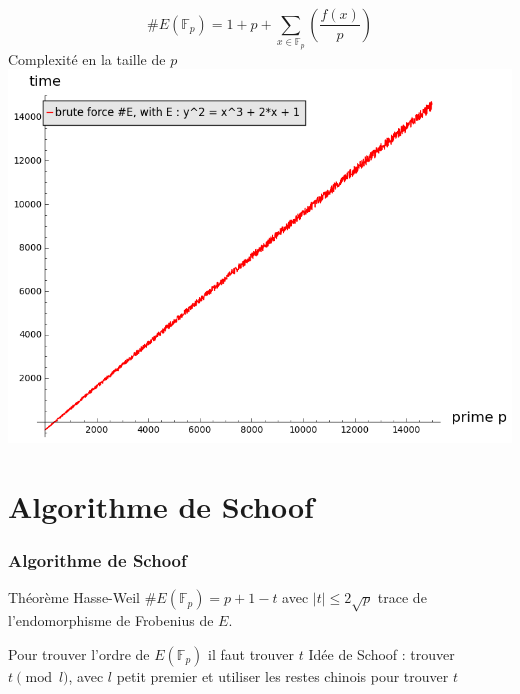 \documentclass[french]{beamer}
\begin{document}
\begin{frame}
\frametitle{}
\begin{equation*}
\#E(\mathbb{F}_p) = 1 + p +\sum_{x \in \mathbb{F}_p}\genfrac(){}{0}{f(x)}{p}
\end{equation*}
Complexité en la taille de $p$
\includegraphics[scale=0.4]{../pictures/brute_force_cputime.png} 
\end{frame}

\section{Algorithme de Schoof}
\begin{frame}
\frametitle{Algorithme de Schoof}

\begin{block}{Théorème Hasse-Weil}
$\#E(\mathbb{F}_p) = p + 1 - t$ avec $|t| \leq 2 \sqrt{p}$ trace de l'endomorphisme de Frobenius de $E$.
\end{block}
Pour trouver l'ordre de $E(\mathbb{F}_p)$ il faut trouver $t$
\newline
Idée de Schoof : trouver $t \pmod l$, avec $l$ petit premier et utiliser les restes chinois pour trouver $t$
\end{frame}
\end{document}
